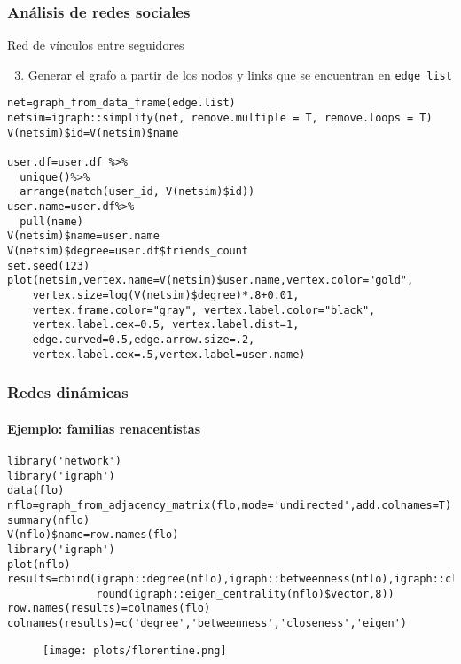 \documentclass[11pt]{beamer}
\begin{document}
\begin{frame}[fragile]
 \frametitle{Análisis de redes sociales} 
Red de vínculos entre seguidores
\begin{enumerate}  \setcounter{enumi}{2}
    \item Generar el grafo a partir de los nodos y links que se encuentran en \texttt{edge\_list}
\end{enumerate}
\begin{verbatim} 
net=graph_from_data_frame(edge.list)
netsim=igraph::simplify(net, remove.multiple = T, remove.loops = T)
V(netsim)$id=V(netsim)$name

user.df=user.df %>%
  unique()%>%
  arrange(match(user_id, V(netsim)$id))
user.name=user.df%>%
  pull(name)
V(netsim)$name=user.name
V(netsim)$degree=user.df$friends_count
set.seed(123)
plot(netsim,vertex.name=V(netsim)$user.name,vertex.color="gold",
    vertex.size=log(V(netsim)$degree)*.8+0.01, 
    vertex.frame.color="gray", vertex.label.color="black",
    vertex.label.cex=0.5, vertex.label.dist=1, 
    edge.curved=0.5,edge.arrow.size=.2,
    vertex.label.cex=.5,vertex.label=user.name)
\end{verbatim}
\end{frame}

\begin{frame}[fragile]
\frametitle{Redes dinámicas}
\framesubtitle{Ejemplo: familias renacentistas}
    \begin{verbatim} 
library('network')
library('igraph')
data(flo)
nflo=graph_from_adjacency_matrix(flo,mode='undirected',add.colnames=T)
summary(nflo)
V(nflo)$name=row.names(flo)
library('igraph')
plot(nflo)
results=cbind(igraph::degree(nflo),igraph::betweenness(nflo),igraph::closeness(nflo),
              round(igraph::eigen_centrality(nflo)$vector,8))
row.names(results)=colnames(flo)
colnames(results)=c('degree','betweenness','closeness','eigen')     
    \end{verbatim}
 

\begin{figure}
    \centering
    \texttt{[image: plots/florentine.png]}
    \label{fig:my_label}
\end{figure}    
\end{frame}
\end{document}
